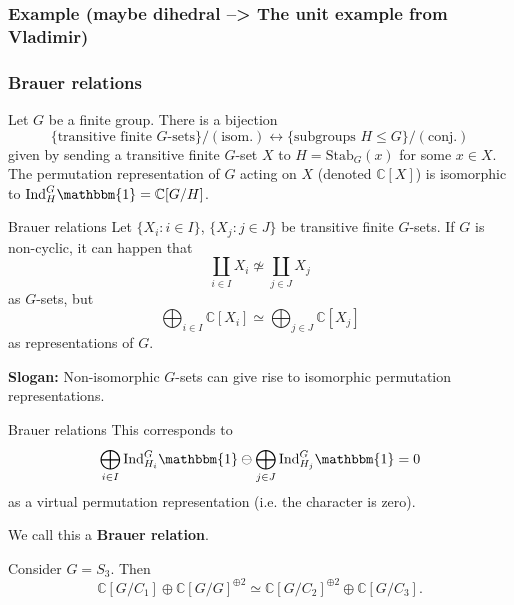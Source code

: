 \documentclass{beamer}
\newcommand{\trivial}{\mathbbm{1}}
\newcommand{\Ind}{\mathrm{Ind}}
\newcommand{\Stab}{\mathrm{Stab}}
\newcommand{\bC}{\mathbb{C}}
\theoremstyle{plain}
\begin{document}
\begin{frame}
    \frametitle{Example (maybe dihedral --> The unit example from Vladimir)}
        
\end{frame}


\begin{frame}
    \frametitle{Brauer relations}
    Let $G$ be a finite group. \pause There is a bijection 
    \[ \{ \text{transitive finite } G \text{-sets}\}/(\text{isom.})\leftrightarrow \{ \text{subgroups } H \leq G \}/(\text{conj.})\] 
    given by sending a transitive finite $G$-set $X$ to $H = \Stab_{G} (x)$ for some $x \in X$. \pause The permutation representation of $G$ acting on $X$ (denoted $\bC[X]$) is isomorphic to $\Ind_{H}^G \trivial  = \bC[G / H]$. 
\end{frame}

\begin{frame}{Brauer relations}
    Let $\{ X_i \colon i \in I\}$, $\{X_j \colon j \in J \}$ be transitive finite $G$-sets. If $G$ is non-cyclic, it can happen that
    \[ \coprod_{i \in I} X_i \not\simeq \coprod_{j \in J} X_j  \]
    as $G$-sets, but \pause 
    \[ \bigoplus_{i \in I}\bC[ X_i] \simeq \bigoplus_{j \in J} \bC[ X_j]\] 
    as representations of $G$. \pause

    \textbf{Slogan:} Non-isomorphic $G$-sets can give rise to isomorphic permutation representations.

\end{frame}

\begin{frame}{Brauer relations}
    This corresponds to  
    \[ \bigoplus_{i \in I} \Ind_{H_i}^G \trivial \ominus \bigoplus_{j \in J} \Ind_{H_j}^G \trivial = 0 \] 
    as a virtual permutation representation (i.e. the character is zero). 

    We call this a \textbf{Brauer relation}.\pause

    \begin{example}
        Consider $G = S_3$. \pause 
        Then 
        \[ \bC[G / C_1] \oplus \bC[G / G]^{\oplus 2} \simeq \bC[G / C_2]^{\oplus 2} \oplus \bC[G / C_3] .\] 
    \end{example}
\end{frame}
\end{document}

